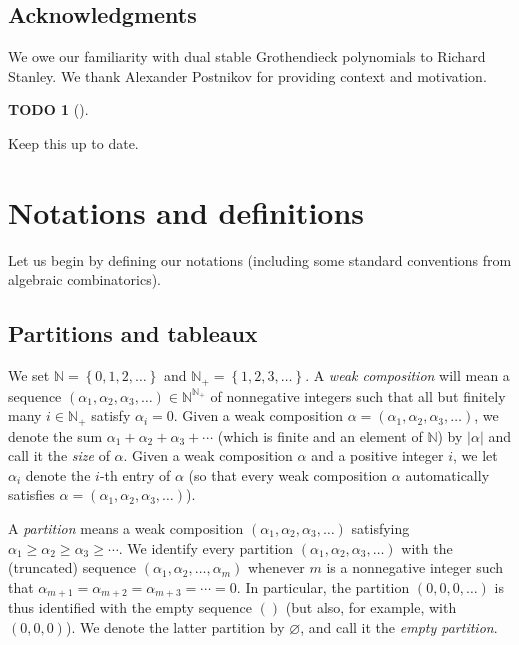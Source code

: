 \documentclass[numbers=enddot,12pt,final,onecolumn,notitlepage]{scrartcl}%
\theoremstyle{definition}
\newtheorem{quest}[theo]{TODO}
\newenvironment{todo}[1][]
{\begin{quest}[#1]\begin{leftbar}}
{\end{leftbar}\end{quest}}
\begin{document}
\subsection{Acknowledgments}

We owe our familiarity with dual stable Grothendieck polynomials to Richard
Stanley. We thank Alexander Postnikov for providing context and motivation.

\begin{todo}
Keep this up to date.
\end{todo}

\section{\label{sect.notations}Notations and definitions}

Let us begin by defining our notations (including some standard conventions
from algebraic combinatorics).

\subsection{Partitions and tableaux}

We set $\mathbb{N}=\left\{  0,1,2,\ldots\right\}  $ and $\mathbb{N}%
_{+}=\left\{  1,2,3,\ldots\right\}  $. A \textit{weak composition} will mean a
sequence $\left(  \alpha_{1},\alpha_{2},\alpha_{3},\ldots\right)
\in\mathbb{N}^{\mathbb{N}_{+}}$ of nonnegative integers such that all but
finitely many $i\in\mathbb{N}_{+}$ satisfy $\alpha_{i}=0$. Given a weak
composition $\alpha=\left(  \alpha_{1},\alpha_{2},\alpha_{3},\ldots\right)  $,
we denote the sum $\alpha_{1}+\alpha_{2}+\alpha_{3}+\cdots$ (which is finite
and an element of $\mathbb{N}$) by $\left\vert \alpha\right\vert $ and call it
the \textit{size} of $\alpha$. Given a weak composition $\alpha$ and a
positive integer $i$, we let $\alpha_{i}$ denote the $i$-th entry of $\alpha$
(so that every weak composition $\alpha$ automatically satisfies
$\alpha=\left(  \alpha_{1},\alpha_{2},\alpha_{3},\ldots\right)  $).

A \textit{partition} means a weak composition $\left(  \alpha_{1},\alpha
_{2},\alpha_{3},\ldots\right)  $ satisfying $\alpha_{1}\geq\alpha_{2}%
\geq\alpha_{3}\geq\cdots$. We identify every partition $\left(  \alpha
_{1},\alpha_{2},\alpha_{3},\ldots\right)  $ with the (truncated) sequence
$\left(  \alpha_{1},\alpha_{2},\ldots,\alpha_{m}\right)  $ whenever $m$ is a
nonnegative integer such that $\alpha_{m+1}=\alpha_{m+2}=\alpha_{m+3}%
=\cdots=0$. In particular, the partition $\left(  0,0,0,\ldots\right)  $ is
thus identified with the empty sequence $\left(  {}\right)  $ (but also, for
example, with $\left(  0,0,0\right)  $). We denote the latter partition by
$\varnothing$, and call it the \textit{empty partition}.
\end{document}
